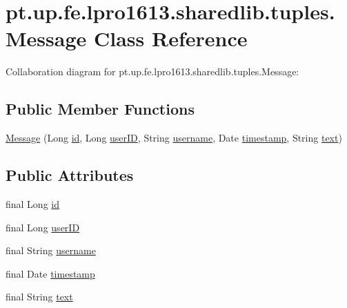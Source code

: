 \hypertarget{classpt_1_1up_1_1fe_1_1lpro1613_1_1sharedlib_1_1tuples_1_1_message}{}\section{pt.\+up.\+fe.\+lpro1613.\+sharedlib.\+tuples.\+Message Class Reference}
\label{classpt_1_1up_1_1fe_1_1lpro1613_1_1sharedlib_1_1tuples_1_1_message}


Collaboration diagram for pt.\+up.\+fe.\+lpro1613.\+sharedlib.\+tuples.\+Message\+:
\subsection*{Public Member Functions}
\begin{DoxyCompactItemize}
\item 
\hyperlink{classpt_1_1up_1_1fe_1_1lpro1613_1_1sharedlib_1_1tuples_1_1_message_ab2ae4e8f872aafb67a761c8769ad98a8}{Message} (Long \hyperlink{classpt_1_1up_1_1fe_1_1lpro1613_1_1sharedlib_1_1tuples_1_1_message_ae18cf9c800010d876ac8b4a6926c068a}{id}, Long \hyperlink{classpt_1_1up_1_1fe_1_1lpro1613_1_1sharedlib_1_1tuples_1_1_message_ad18f784cb53089b1cd90e2f6c849b5e8}{user\+ID}, String \hyperlink{classpt_1_1up_1_1fe_1_1lpro1613_1_1sharedlib_1_1tuples_1_1_message_a061e241d4c8a800c6b5d7271d68c0c11}{username}, Date \hyperlink{classpt_1_1up_1_1fe_1_1lpro1613_1_1sharedlib_1_1tuples_1_1_message_afe3feca5f96527b7182581b84b64ba68}{timestamp}, String \hyperlink{classpt_1_1up_1_1fe_1_1lpro1613_1_1sharedlib_1_1tuples_1_1_message_ae7464bbbfe859ea3d45ea468a3f41a45}{text})
\end{DoxyCompactItemize}
\subsection*{Public Attributes}
\begin{DoxyCompactItemize}
\item 
final Long \hyperlink{classpt_1_1up_1_1fe_1_1lpro1613_1_1sharedlib_1_1tuples_1_1_message_ae18cf9c800010d876ac8b4a6926c068a}{id}
\item 
final Long \hyperlink{classpt_1_1up_1_1fe_1_1lpro1613_1_1sharedlib_1_1tuples_1_1_message_ad18f784cb53089b1cd90e2f6c849b5e8}{user\+ID}
\item 
final String \hyperlink{classpt_1_1up_1_1fe_1_1lpro1613_1_1sharedlib_1_1tuples_1_1_message_a061e241d4c8a800c6b5d7271d68c0c11}{username}
\item 
final Date \hyperlink{classpt_1_1up_1_1fe_1_1lpro1613_1_1sharedlib_1_1tuples_1_1_message_afe3feca5f96527b7182581b84b64ba68}{timestamp}
\item 
final String \hyperlink{classpt_1_1up_1_1fe_1_1lpro1613_1_1sharedlib_1_1tuples_1_1_message_ae7464bbbfe859ea3d45ea468a3f41a45}{text}
\end{DoxyCompactItemize}


